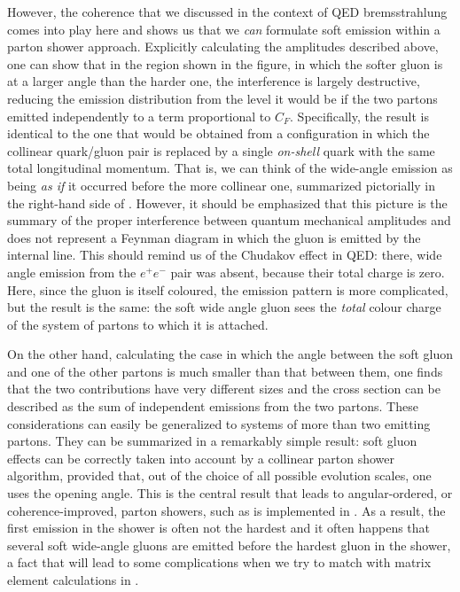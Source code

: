 However, the coherence that we discussed in the context of QED
brems\-strahlung comes into play here and shows us that we \emph{can\/}
formulate soft emission within a parton shower approach.  Explicitly
calculating the amplitudes described above, one can show that in the
region shown in the figure, in which the softer gluon is at a larger
angle than the harder one, the interference is largely destructive,
reducing the emission distribution from the level it would be if
the two partons emitted independently to a term proportional to $C_F$.
Specifically, the result is identical to the one that would be obtained
from a configuration in which the collinear quark/gluon pair is replaced
by a single \emph{on-shell\/} quark with the same total longitudinal
momentum.  That is, we can think of the wide-angle emission as being
\emph{as if\/} it occurred before the more collinear one, summarized
pictorially in the right-hand side of .
However, it should be emphasized that this picture is the summary of the
proper interference between quantum mechanical amplitudes and does not
represent a Feynman diagram in which the gluon is emitted by the
internal line.  This should remind us of the Chudakov effect in QED:
there, wide angle emission from the $e^+e^-$ pair was absent, because
their total charge is zero.  Here, since the gluon is itself coloured,
the emission pattern is more complicated, but the result is the same:
the soft wide angle gluon sees the \emph{total\/} colour charge of the
system of partons to which it is attached.

On the other hand, calculating the case in which the angle between the
soft gluon and one of the other partons is much smaller than that
between them, one finds that the two contributions have very different
sizes and the cross section can be described as the sum of independent
emissions from the two partons.  These considerations can easily be
generalized to systems of more than two emitting partons.  They can be
summarized in a remarkably simple result: soft gluon effects can be
correctly taken into account by a collinear parton shower algorithm,
provided that, out of the choice of all possible evolution scales, one
uses the opening angle.  This is the central result that leads to
angular-ordered, or coherence-improved, parton showers, such as is
implemented in \herwig.  As a result, the first emission in the shower
is often not the hardest and it often happens that several soft
wide-angle gluons are emitted before the hardest gluon in the shower, a
fact that will lead to some complications when we try to match with
matrix element calculations in .

